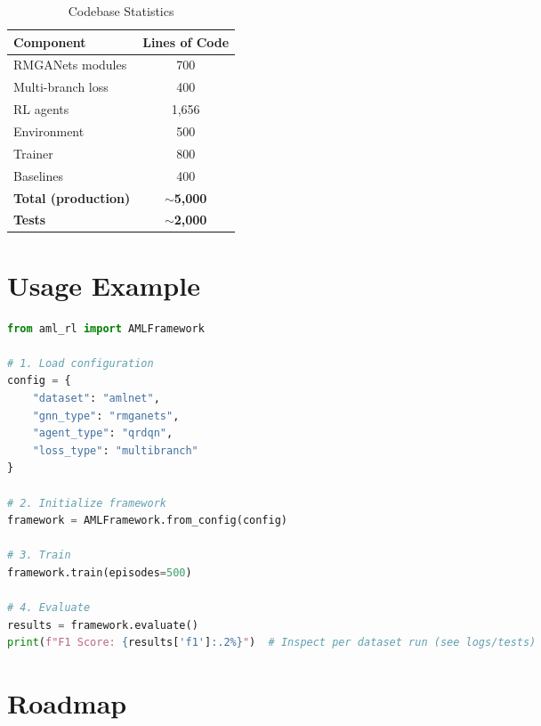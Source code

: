 \documentclass[11pt,a4paper]{article}
\begin{document}
\begin{table}[htbp]
\centering
\caption{Codebase Statistics}
\begin{tabular}{@{}lc@{}}
\toprule
\textbf{Component} & \textbf{Lines of Code} \\
\midrule
RMGANets modules & 700 \\
Multi-branch loss & 400 \\
RL agents & 1,656 \\
Environment & 500 \\
Trainer & 800 \\
Baselines & 400 \\
\midrule
\textbf{Total (production)} & \textbf{$\sim$5,000} \\
\textbf{Tests} & \textbf{$\sim$2,000} \\
\bottomrule
\end{tabular}
\end{table}

\section{Usage Example}

\begin{lstlisting}[language=Python, caption=Quick Start Example]
from aml_rl import AMLFramework

# 1. Load configuration
config = {
    "dataset": "amlnet",
    "gnn_type": "rmganets",
    "agent_type": "qrdqn",
    "loss_type": "multibranch"
}

# 2. Initialize framework
framework = AMLFramework.from_config(config)

# 3. Train
framework.train(episodes=500)

# 4. Evaluate
results = framework.evaluate()
print(f"F1 Score: {results['f1']:.2%}")  # Inspect per dataset run (see logs/tests)
\end{lstlisting}

\section{Roadmap}
\end{document}
